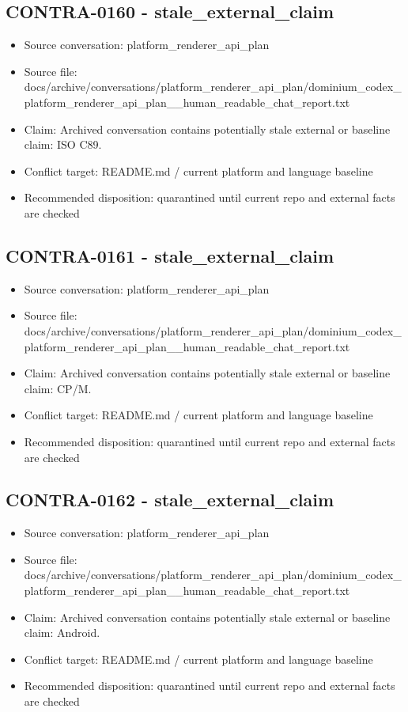 \documentclass[11pt,a4paper]{report}
\begin{document}
\subsection{CONTRA-0160 - stale\_external\_claim}

\begin{itemize}
\item Source conversation: platform\_renderer\_api\_plan
\item Source file: docs/archive/conversations/platform\_renderer\_api\_plan/dominium\_codex\_platform\_renderer\_api\_plan\_\_human\_readable\_chat\_report.txt
\item Claim: Archived conversation contains potentially stale external or baseline claim: ISO C89.
\item Conflict target: README.md / current platform and language baseline
\item Recommended disposition: quarantined until current repo and external facts are checked
\end{itemize}

\subsection{CONTRA-0161 - stale\_external\_claim}

\begin{itemize}
\item Source conversation: platform\_renderer\_api\_plan
\item Source file: docs/archive/conversations/platform\_renderer\_api\_plan/dominium\_codex\_platform\_renderer\_api\_plan\_\_human\_readable\_chat\_report.txt
\item Claim: Archived conversation contains potentially stale external or baseline claim: CP/M.
\item Conflict target: README.md / current platform and language baseline
\item Recommended disposition: quarantined until current repo and external facts are checked
\end{itemize}

\subsection{CONTRA-0162 - stale\_external\_claim}

\begin{itemize}
\item Source conversation: platform\_renderer\_api\_plan
\item Source file: docs/archive/conversations/platform\_renderer\_api\_plan/dominium\_codex\_platform\_renderer\_api\_plan\_\_human\_readable\_chat\_report.txt
\item Claim: Archived conversation contains potentially stale external or baseline claim: Android.
\item Conflict target: README.md / current platform and language baseline
\item Recommended disposition: quarantined until current repo and external facts are checked
\end{itemize}
\end{document}

